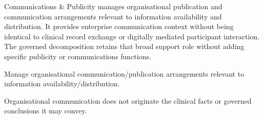 Communications \& Publicity manages organisational publication and communication arrangements relevant to information availability and distribution. It provides enterprise communication context without being identical to clinical record exchange or digitally mediated participant interaction. The governed decomposition retains that broad support role without adding specific publicity or communications functions.



Manage organisational communication/\allowbreak{}publication arrangements relevant to information availability/\allowbreak{}distribution.



Organisational communication does not originate the clinical facts or governed conclusions it may convey.


